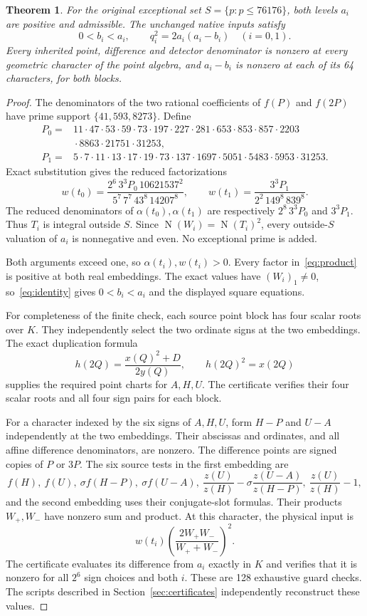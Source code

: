 \documentclass[11pt,a4paper]{article}
\newtheorem{theorem}{Theorem}[section]
\DeclareMathOperator{\N}{N}
\begin{document}
\begin{theorem}\label{thm:fixture}
For the original exceptional set $S=\{p:p\le76176\}$, both levels
$a_i$ are positive and admissible. The unchanged native inputs satisfy
\[
                 0<b_i<a_i,\qquad q_i^2=2a_i(a_i-b_i)
                 \quad(i=0,1).
\]
Every inherited point, difference and detector denominator is nonzero
at every geometric character of the point algebra, and $a_i-b_i$
is nonzero at each of its 64 characters, for both blocks.
\end{theorem}
\begin{proof}
The denominators of the two rational coefficients of $f(P)$ and $f(2P)$
have prime support $\{41,593,8273\}$. Define
\[
 \begin{split}
 P_0={}&11\cdot47\cdot53\cdot59\cdot73\cdot197\cdot227\cdot281
 \cdot653\cdot853\cdot857\cdot2203\\
 &{}\cdot8863\cdot21751\cdot31253,\\
 P_1={}&5\cdot7\cdot11\cdot13\cdot17\cdot19\cdot73\cdot137
 \cdot1697\cdot5051\cdot5483\cdot5953\cdot31253.
 \end{split}
\]
Exact substitution gives the reduced factorizations
\[
 w(t_0)=
 \frac{2^6\,3^3P_0\,10621537^2}{5^7\,7^7\,43^8\,14207^8},
 \qquad
 w(t_1)=\frac{3^3P_1}{2^2\,149^8\,839^8}.
\]
The reduced denominators of $\alpha(t_0),\alpha(t_1)$ are respectively
$2^8\,3^3P_0$ and $3^3P_1$. Thus $T_i$ is integral outside $S$.
Since $\N(W_i)=\N(T_i)^2$, every outside-$S$ valuation of $a_i$ is
nonnegative and even. No exceptional prime is added.

Both arguments exceed one, so $\alpha(t_i),w(t_i)>0$. Every factor
in~\eqref{eq:product} is positive at both real embeddings.
The exact values have $(W_i)_1\ne0$, so~\eqref{eq:identity} gives
$0<b_i<a_i$ and the displayed square equations.

For completeness of the finite check, each source point block has four
scalar roots over $K$. They independently select the two ordinate signs
at the two embeddings. The exact duplication formula
\[
       h(2Q)=\frac{x(Q)^2+D}{2y(Q)},\qquad h(2Q)^2=x(2Q)
\]
supplies the required point charts for $A,H,U$. The certificate verifies
their four scalar roots and all four sign pairs for each block.

For a character indexed by the six signs of $A,H,U$, form
$H-P$ and $U-A$ independently at the two embeddings. Their abscissas
and ordinates, and all affine difference denominators, are nonzero.
The difference points are signed copies of $P$ or $3P$.
The six source tests in the first embedding are
\[
 f(H),\ f(U),\ \sigma f(H-P),\ \sigma f(U-A),\
 \frac{z(U)}{z(H)}
 -\sigma\frac{z(U-A)}{z(H-P)},\
 \frac{z(U)}{z(H)}-1,
\]
and the second embedding uses their conjugate-slot formulas. Their
products $W_+,W_-$ have nonzero sum and product. At this character,
the physical input is
\[
                   w(t_i)\left(\frac{2W_+W_-}{W_++W_-}\right)^2.
\]
The certificate evaluates its difference from $a_i$ exactly in $K$
and verifies that it is nonzero for all $2^6$ sign choices and both
$i$. These are 128 exhaustive guard checks. The scripts described in
Section~\ref{sec:certificates} independently reconstruct these values.
\end{proof}
\end{document}
